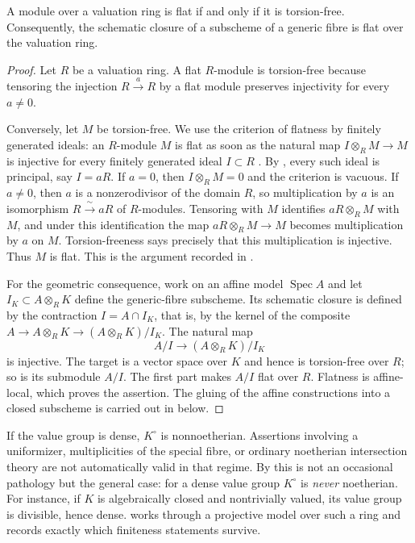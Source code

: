 \begin{lemma}
\label{lem:torsion-free-flat-valuation}
A module over a valuation ring is flat if and only if it is torsion-free.
Consequently, the schematic closure of a subscheme of a generic fibre is flat
over the valuation ring.
\end{lemma}
\begin{proof}
Let $R$ be a valuation ring.  A flat $R$-module is torsion-free because
tensoring the injection $R\xrightarrow{\,a\,}R$ by a flat module preserves
injectivity for every $a\ne0$.

Conversely, let $M$ be torsion-free.  We use the criterion of flatness by
finitely generated ideals: an $R$-module $M$ is flat as soon as the natural
map $I\otimes_RM\to M$ is injective for every finitely generated ideal
$I\subset R$ \cite[Tag 00M5]{stacks-project}.  By
, every such ideal is principal, say
$I=aR$.  If $a=0$, then $I\otimes_RM=0$ and the criterion is vacuous.  If
$a\ne0$, then $a$ is a nonzerodivisor of the domain $R$, so multiplication
by $a$ is an isomorphism $R\xrightarrow{\ \sim\ }aR$ of $R$-modules.
Tensoring with $M$ identifies $aR\otimes_RM$ with $M$, and under this
identification the map $aR\otimes_RM\to M$ becomes multiplication by $a$ on
$M$.  Torsion-freeness says precisely that this multiplication is
injective.  Thus $M$ is flat.  This is the argument recorded in
\cite[Tag 0539]{stacks-project}.

For the geometric consequence, work on an affine model
$\operatorname{Spec}A$ and let
$I_K\subset A\otimes_RK$ define the generic-fibre subscheme.  Its schematic
closure is defined by the contraction $I=A\cap I_K$, that is, by the kernel
of the composite $A\to A\otimes_RK\to(A\otimes_RK)/I_K$.  The natural map
\[
            A/I\longrightarrow (A\otimes_RK)/I_K
\]
is injective.  The target is a vector space over $K$ and hence is
torsion-free over $R$; so is its submodule $A/I$.  The first part makes
$A/I$ flat over $R$.  Flatness is affine-local, which proves the assertion.
The gluing of the affine constructions into a closed subscheme is carried
out in  below.
\end{proof}

\begin{remark}\label{rem:dense-value-group-model-limitations}
If the value group is dense, $K^\circ$ is nonnoetherian. Assertions involving
a uniformizer, multiplicities of the special fibre, or ordinary noetherian intersection
theory are not automatically valid in that regime.
By  this is not an occasional pathology
but the general case: for a dense value group $K^\circ$ is \emph{never}
noetherian.  For instance, if $K$ is algebraically closed and nontrivially
valued, its value group is divisible, hence dense.
 works through a projective model over such
a ring and records exactly which finiteness statements survive.
\end{remark}

